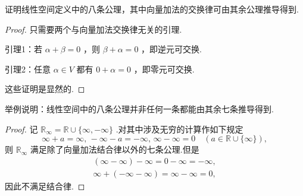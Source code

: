 \begin{prob}[23]
	证明线性空间定义中的八条公理，其中向量加法的交换律可由其余公理推导得到.
\end{prob}
\begin{proof}
	只需要两个与向量加法交换律无关的引理.

	引理1：若 $\alpha+\beta=0$ ，则 $\beta+\alpha=0$ ，即逆元可交换.

	引理2：任意 $\alpha\in V$ 都有 $0+\alpha=0$ ，即零元可交换.

	这些证明是显然的.
\end{proof}
\begin{prob}[24]
	举例说明：线性空间中的八条公理并非任何一条都能由其余七条推导得到.
\end{prob}
\begin{proof}
	记 $\mathbb{R}_\infty=\mathbb{R}\cup\{\infty,-\infty\}$ .对其中涉及无穷的计算作如下规定
	\[
		\infty+a=\infty,\,-\infty-a=-\infty,\,\infty-\infty=0\quad(a\in \mathbb{R}\cup\{\infty\}),
	\]
	则 $\mathbb{R}_\infty$ 满足除了向量加法结合律以外的七条公理.但是
	\begin{gather*}
		(\infty-\infty)-\infty=0-\infty=-\infty,\\
		\infty+(-\infty-\infty)=\infty-\infty=0,
	\end{gather*}
	因此不满足结合律.
\end{proof}
